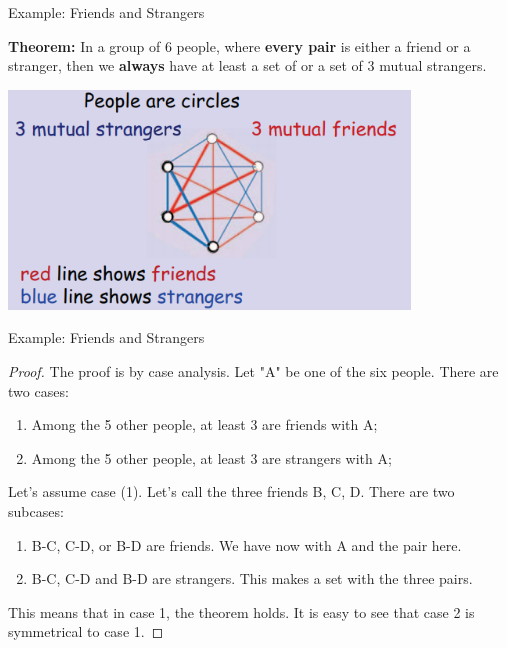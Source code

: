 \begin{frame}{Example: Friends and Strangers}

  {\bf Theorem:} In a group of 6 people, where {\bf every pair} is either a friend or a stranger, then we {\bf always} have at least a set of  or a set of \alert{3 mutual strangers}.

  \begin{center}
    \includegraphics[width=0.8\textwidth]{../img/friends_and_strangers}
  \end{center}
\end{frame}

\begin{frame}{Example: Friends and Strangers}
  \begin{proof}
    The proof is by case analysis. Let "A" be one of the six people. There are two cases:
    \begin{enumerate}
      \item Among the 5 other people, at least 3 are friends with A;
      \item Among the 5 other people, at least 3 are strangers with A;
    \end{enumerate}\medskip

    Let's assume case (1). Let's call the three friends B, C, D. There are two subcases:
    \begin{enumerate}[A]
      \item B-C, C-D, or B-D are friends. We have now  with A and the pair here.
      \item B-C, C-D and B-D are strangers. This makes a  set with the three pairs.
    \end{enumerate}\medskip

    This means that in case 1, the theorem holds. It is easy to see that case 2 is symmetrical to case 1.
  \end{proof}
\end{frame}


